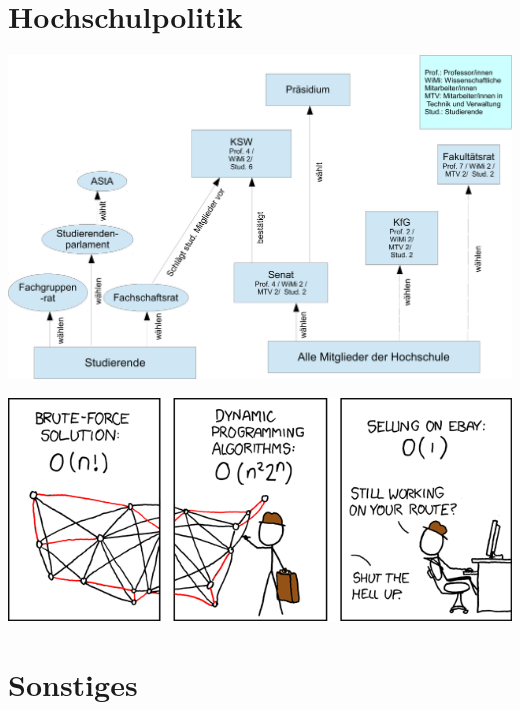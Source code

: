 \documentclass[
  final,
  a4paper,              %
  style=screen,
  twoside,
  nexus,                %
  lnum,                 %
]{tubsartcl}
\begin{document}
	\section{Hochschulpolitik}
		\label{politik}
		\begin{minipage}[H]{1.0\linewidth}
		\begin{center}
			\centering
			\includegraphics[width=\textwidth]{bilder/gremienkunde/gremienkunde3}
		\end{center}
		\end{minipage}
		\vspace{0.5cm}
		\begin{multicols}{2}
		\raggedcolumns
		
		
		\end{multicols}

		\vfill
		\begin{center}
			\includegraphics[width=\textwidth]{bilder/XKCD/travelling_salesman}
		\end{center}
		\vfill
	\newpage

	\section{Sonstiges}
		\label{sonstiges}
		\begin{multicols}{2}
		
		
		\end{multicols}
		\newpage
		
		\newpage
		
\end{document}
